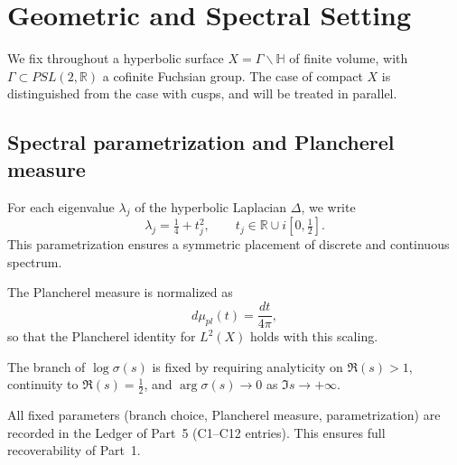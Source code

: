 
\section{Geometric and Spectral Setting}
\label{sec:geom-spec}

We fix throughout a hyperbolic surface $X=\Gamma\backslash\mathbb{H}$ of finite volume, 
with $\Gamma\subset PSL(2,\mathbb{R})$ a cofinite Fuchsian group.
The case of compact $X$ is distinguished from the case with cusps, 
and will be treated in parallel.

\subsection{Spectral parametrization and Plancherel measure}

\begin{definition}
\label{def:param}
For each eigenvalue $\lambda_j$ of the hyperbolic Laplacian $\Delta$, 
we write
\[
\lambda_j = \tfrac14+t_j^2, \qquad t_j\in\mathbb{R}\cup i[0,\tfrac12].
\]
This parametrization ensures a symmetric placement of discrete 
and continuous spectrum.
\end{definition}

\begin{definition}
\label{def:measure}
The Plancherel measure is normalized as
\[
d\mu_{pl}(t) = \frac{dt}{4\pi},
\]
so that the Plancherel identity for $L^2(X)$ holds with this scaling.
\end{definition}

\begin{definition}
\label{def:branch}
The branch of $\log\sigma(s)$ is fixed by requiring analyticity 
on $\Re(s)>1$, continuity to $\Re(s)=\tfrac12$, 
and $\arg\sigma(s)\to 0$ as $\Im s\to+\infty$.
\end{definition}

\begin{remark}
All fixed parameters (branch choice, Plancherel measure, parametrization) 
are recorded in the Ledger of Part~5 (C1–C12 entries). 
This ensures full recoverability of Part~1.
\end{remark}

